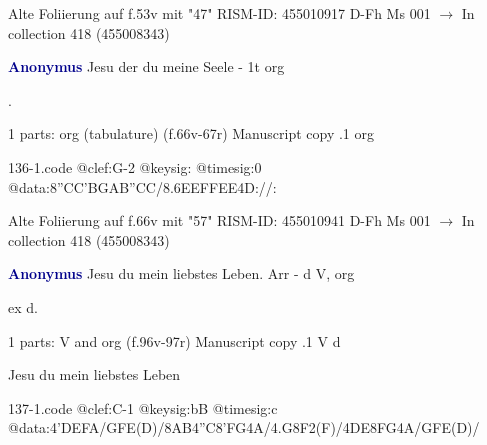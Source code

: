 \documentclass[twocolumn]{book}
\begin{document}
\newline Alte Foliierung auf f.53v mit "47"
\newline RISM-ID: 455010917
\newline D-Fh  Ms 001
\newline $\rightarrow$ In collection 418 (455008343)
      
\newline \par \vspace{7pt} \textcolor{darkblue}{\textbf{Anonymus  }}
\newline Jesu der du meine Seele - 1t
\newline org
\newline \begin{itshape}[f.66v, at left:] .\end{itshape} 
\newline \textcolor{darkblue}{}  1 parts: org (tabulature)  (f.66v-67r)
\newline Manuscript copy
.1  org  
\begin{filecontents*}{136-1.code}
@clef:G-2
@keysig:
@timesig:0
@data:{8''CC'BG}{AB''CC}/{8.6EEFF}{EE}4D://:
\end{filecontents*}
\newline
%

\newline Alte Foliierung auf f.66v mit "57"
\newline RISM-ID: 455010941
\newline D-Fh  Ms 001
\newline $\rightarrow$ In collection 418 (455008343)
      
\newline \par \vspace{7pt} \textcolor{darkblue}{\textbf{Anonymus  }}
\newline Jesu du mein liebstes Leben. Arr - d
\newline V, org
\newline \begin{itshape}[f.96v, at left:] ex d.\end{itshape} 
\newline \textcolor{darkblue}{}  1 parts: V and org  (f.96v-97r)
\newline Manuscript copy
.1  V  d
\newline \begin{footnotesize} Jesu du mein liebstes Leben \end{footnotesize}  
\begin{filecontents*}{137-1.code}
@clef:C-1
@keysig:bB
@timesig:c
@data:4'DEFA/GFE(D)/{8AB}4''C{8'FG}4A/4.G8F2(F)/4DE{8FG}4A/GFE(D)/
\end{filecontents*}
\newline
%
\end{document}
